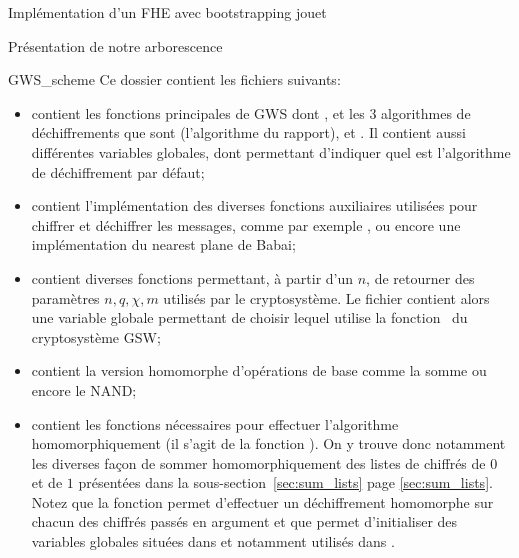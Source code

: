 \begin{section}{Implémentation d'un FHE avec bootstrapping \og{}jouet\fg~{}}
\begin{subsection}{Présentation de notre arborescence}
\begin{subsubsection}{GWS\_scheme}
Ce dossier contient les fichiers suivants:
\begin{itemize}
\item {} contient les fonctions principales de GWS dont ,  et les 3
algorithmes de déchiffrements que sont  (l'algorithme  du rapport), 
et . Il contient aussi différentes variables globales, dont  permettant d'indiquer
quel est l'algorithme de déchiffrement par défaut;
\item {} contient l'implémentation des diverses fonctions auxiliaires utilisées pour
chiffrer et déchiffrer les messages, comme par exemple , ou encore une implémentation du nearest plane de
Babai;
\item {} contient diverses fonctions permettant, à partir d'un $n$, de retourner des paramètres
$n, q, \chi, m$ utilisés par le cryptosystème. Le fichier  contient alors une variable globale
 permettant de choisir lequel utilise la fonction  du cryptosystème GSW; 
\item {} contient la version homomorphe
	d'opérations de base comme la somme ou encore le NAND;
\item {} contient les fonctions nécessaires pour
	effectuer l'algorithme  homomorphiquement (il s'agit de la fonction ).
	On y trouve donc notamment les diverses façon de sommer homomorphiquement des listes de chiffrés de $0$ et de
	$1$ présentées dans la sous-section~\ref{sec:sum_lists} page \ref{sec:sum_lists}. Notez que la fonction
	 permet d'effectuer un déchiffrement homomorphe sur chacun des chiffrés passés
	en argument et que  permet d'initialiser des variables globales  situées dans  et notamment utilisés dans
	. 
	\end{itemize}
\end{subsubsection} %


\end{subsection}
\end{section}
